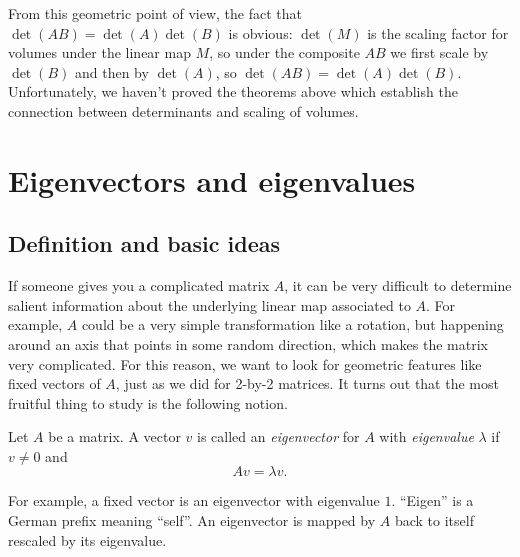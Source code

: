 \documentclass{article}
\begin{document}
\begin{Remark}
From this geometric point of view, the fact that
\(\det(AB)=\det(A)\det(B)\) is obvious: \(\det(M)\) is the scaling
factor for volumes under the linear map \(M\), so under the
composite \(AB\) we first scale by \(\det(B)\) and then by
\(\det(A)\), so \(\det(AB)=\det(A)\det(B)\). Unfortunately, we
haven't proved the theorems above which establish the connection
between determinants and scaling of volumes.


\end{Remark}
\clearpage
\section{Eigenvectors and eigenvalues}
\subsection{Definition and basic ideas}


If someone gives you a complicated matrix \(A\), it can be very
difficult to determine salient information about the underlying linear
map associated to \(A\). For example, \(A\) could be a very simple
transformation like a rotation, but happening around an axis that
points in some random direction, which makes the matrix very
complicated. For this reason, we want to look for geometric features
like fixed vectors of \(A\), just as we did for 2-by-2 matrices. It
turns out that the most fruitful thing to study is the following
notion.


\begin{Definition}\label{dfn:eigenvector}
Let \(A\) be a matrix. A vector \(v\) is called an {\em eigenvector}
for \(A\) with {\em eigenvalue} \(\lambda\) if \(v\neq 0\) and
\[Av=\lambda v.\]


\end{Definition}
For example, a fixed vector is an eigenvector with eigenvalue
\(1\). ``Eigen'' is a German prefix meaning ``self''. An eigenvector
is mapped by \(A\) back to itself rescaled by its eigenvalue.
\end{document}
